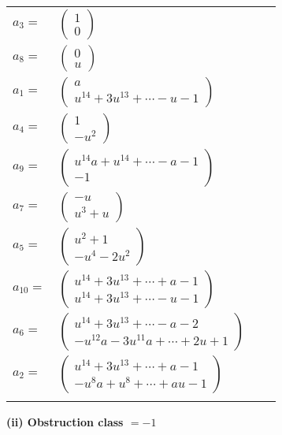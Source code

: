 \documentclass[1p]{elsarticle_modified}
\theoremstyle{definition}
\begin{document}
\begin{tabular}{m{7pt} m{180pt} m{7pt} m{180pt} }
\flushright $a_{3}=$&$\begin{pmatrix}1\\0\end{pmatrix}$ \\
\flushright $a_{8}=$&$\begin{pmatrix}0\\u\end{pmatrix}$ \\
\flushright $a_{1}=$&$\begin{pmatrix}a\\u^{14}+3 u^{13}+\cdots- u-1\end{pmatrix}$ \\
\flushright $a_{4}=$&$\begin{pmatrix}1\\- u^2\end{pmatrix}$ \\
\flushright $a_{9}=$&$\begin{pmatrix}u^{14} a+u^{14}+\cdots- a-1\\-1\end{pmatrix}$ \\
\flushright $a_{7}=$&$\begin{pmatrix}- u\\u^3+u\end{pmatrix}$ \\
\flushright $a_{5}=$&$\begin{pmatrix}u^2+1\\- u^4-2 u^2\end{pmatrix}$ \\
\flushright $a_{10}=$&$\begin{pmatrix}u^{14}+3 u^{13}+\cdots+a-1\\u^{14}+3 u^{13}+\cdots- u-1\end{pmatrix}$ \\
\flushright $a_{6}=$&$\begin{pmatrix}u^{14}+3 u^{13}+\cdots- a-2\\- u^{12} a-3 u^{11} a+\cdots+2 u+1\end{pmatrix}$ \\
\flushright $a_{2}=$&$\begin{pmatrix}u^{14}+3 u^{13}+\cdots+a-1\\- u^8 a+u^8+\cdots+a u-1\end{pmatrix}$\\&\end{tabular}
\flushleft \textbf{(ii) Obstruction class $= -1$}\\~\\
\end{document}
